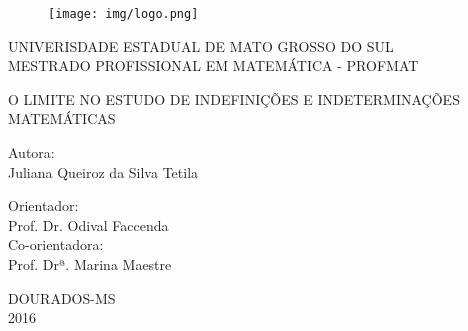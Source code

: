 \thispagestyle{empty}
\begin{center}


\begin{figure}[H]
\centering %
\texttt{[image: img/logo.png]}
\end{figure}


\normalsize{UNIVERISDADE ESTADUAL DE MATO GROSSO DO SUL\\ MESTRADO PROFISSIONAL EM MATEMÁTICA - PROFMAT}


\vspace*{3cm}

\Large{O LIMITE NO ESTUDO DE INDEFINIÇÕES E INDETERMINAÇÕES MATEMÁTICAS}


\vspace*{3cm}
\normalsize{Autora:}\\
\normalsize{Juliana Queiroz da Silva Tetila}

\vspace*{2cm}
\normalsize{Orientador:}\\
\normalsize{Prof. Dr. Odival Faccenda}\\
\normalsize{Co-orientadora:}\\
\normalsize{Prof. Drª. Marina Maestre}
\vspace*{5cm}


\large{DOURADOS-MS \\ 2016}
\end{center}